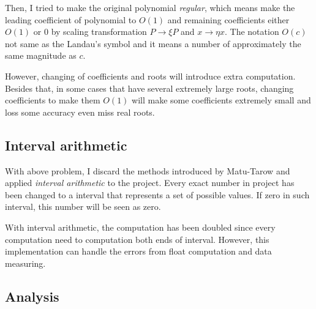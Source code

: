 Then, I tried to make the original polynomial
\textit{regular}\cite{Approximate}, which means make the leading coefficient of
polynomial to $O(1)$ and remaining coefficients either $O(1)$ or $0$ by scaling
transformation $P\rightarrow \xi P $ and $x \rightarrow  \eta x$. The notation $O(c)$
not same as the Landau’s symbol and it means a number of approximately the same
magnitude as $c$.

However, changing of coefficients and roots will introduce extra computation.
Besides that, in some cases that have several extremely large roots, changing
coefficients to make them $O(1)$ will make some coefficients extremely small and
loss some accuracy even miss real roots.

\subsection{Interval arithmetic}

With above problem, I discard the methods introduced by
Matu-Tarow\cite{Approximate} and applied \textit{interval arithmetic} to the
project. Every exact number in project has been changed to a interval that
represents a set of possible values. If zero in such interval, this number will
be seen as zero.

With interval arithmetic, the computation has been doubled since every
computation need to computation both ends of interval. However, this
implementation can handle the errors from float computation and data measuring.

\subsection{Analysis}

